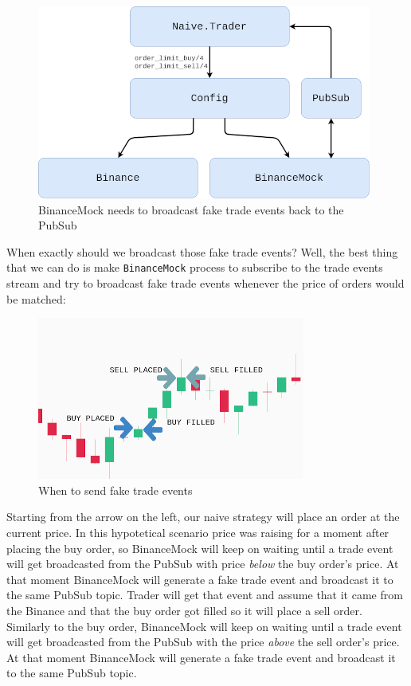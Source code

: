 \documentclass[
]{book}
\begin{document}
\begin{figure}
\centering
\includegraphics{images/chapter_04_03_proposal_pubsub.png}
\caption{BinanceMock needs to broadcast fake trade events back to the PubSub}
\end{figure}

When exactly should we broadcast those fake trade events? Well, the best thing
that we can do is make \texttt{BinanceMock} process to subscribe to the trade events stream and try to broadcast fake trade events whenever the price of orders would be matched:

\begin{figure}
\centering
\includegraphics{images/chapter_04_04_explenation.png}
\caption{When to send fake trade events}
\end{figure}

Starting from the arrow on the left, our naive strategy will place an order at the current price.
In this hypotetical scenario price was raising for a moment after placing the buy order, so BinanceMock will keep on waiting until a trade event will get broadcasted from the PubSub with price \emph{below} the buy order's price. At that moment BinanceMock will generate a fake trade event and broadcast it to the same PubSub topic.
Trader will get that event and assume that it came from the Binance and that the buy order got filled so it will place a sell order.
Similarly to the buy order, BinanceMock will keep on waiting until a trade event will get broadcasted from the PubSub with the price \emph{above} the sell order's price. At that moment BinanceMock will generate a fake trade event and broadcast it to the same PubSub topic.
\end{document}
